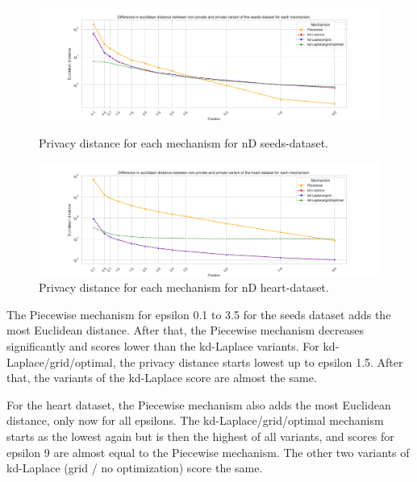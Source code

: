 \begin{figure}[H]
    \centering
    \begin{minipage}[c]{0.80\textwidth}
        \includegraphics[width=1\textwidth]{Results/RQ2-nd/seeds-dataset/privacy_distance_plot.png}
        \caption{Privacy distance for each mechanism for nD seeds-dataset.}
        \label{fig:privacy_seeds-dataset_comparison_nd_privacy_distance_plot}
    \end{minipage}
    \begin{minipage}[c]{0.80\textwidth}
        \includegraphics[width=1\textwidth]{Results/RQ2-nd/heart-dataset/privacy_distance_plot.png}
        \caption{Privacy distance for each mechanism for nD heart-dataset.}
        \label{fig:privacy_heart-dataset_comparison_nd_privacy_distance_plot}
    \end{minipage}
\end{figure}
The Piecewise mechanism for epsilon 0.1 to 3.5 for the seeds dataset adds the most Euclidean distance. After that, the Piecewise mechanism decreases significantly and scores lower than the kd-Laplace variants. For kd-Laplace/grid/optimal, the privacy distance starts lowest up to epsilon 1.5. After that, the variants of the kd-Laplace score are almost the same.

For the heart dataset, the Piecewise mechanism also adds the most Euclidean distance, only now for all epsilons. The kd-Laplace/grid/optimal mechanism starts as the lowest again but is then the highest of all variants, and scores for epsilon 9 are almost equal to the Piecewise mechanism. The other two variants of kd-Laplace (grid / no optimization) score the same.


